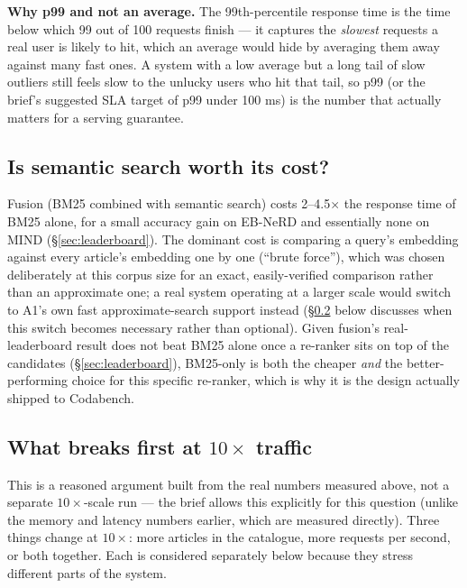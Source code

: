 \documentclass[11pt,a4paper]{article}
\begin{document}
\textbf{Why p99 and not an average.} The 99th-percentile response time is the time below which 99
out of 100 requests finish --- it captures the \emph{slowest} requests a real user is likely to
hit, which an average would hide by averaging them away against many fast ones. A system with a
low average but a long tail of slow outliers still feels slow to the unlucky users who hit that
tail, so p99 (or the brief's suggested SLA target of p99 under 100 ms) is the number that actually
matters for a serving guarantee.

\subsection{Is semantic search worth its cost?}

Fusion (BM25 combined with semantic search) costs 2--4.5$\times$ the response time of BM25 alone,
for a small accuracy gain on EB-NeRD and essentially none on MIND (\S\ref{sec:leaderboard}). The
dominant cost is comparing a query's embedding against every article's embedding one by one
(``brute force''), which was chosen deliberately at this corpus size for an exact, easily-verified
comparison rather than an approximate one; a real system operating at a larger scale would switch
to A1's own fast approximate-search support instead (\S\ref{sec:q4-10x} below discusses when this
switch becomes necessary rather than optional). Given fusion's real-leaderboard result does not
beat BM25 alone once a re-ranker sits on top of the candidates (\S\ref{sec:leaderboard}), BM25-only
is both the cheaper \emph{and} the better-performing choice for this specific re-ranker, which is
why it is the design actually shipped to Codabench.

\subsection{What breaks first at $10\times$ traffic}
\label{sec:q4-10x}

This is a reasoned argument built from the real numbers measured above, not a separate
$10\times$-scale run --- the brief allows this explicitly for this question (unlike the memory and
latency numbers earlier, which are measured directly). Three things change at $10\times$: more
articles in the catalogue, more requests per second, or both together. Each is considered
separately below because they stress different parts of the system.
\end{document}
